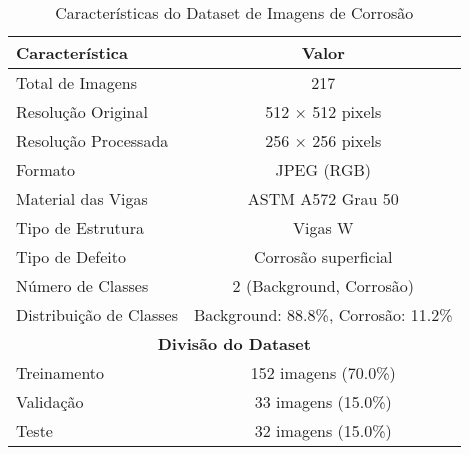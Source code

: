\begin{table}[htbp]
\centering
\caption{Características do Dataset de Imagens de Corrosão}
\label{tab:dataset_caracteristicas}
\begin{tabular}{|l|c|}
\hline
\textbf{Característica} & \textbf{Valor} \\
\hline
Total de Imagens & 217 \\
\hline
Resolução Original & 512 × 512 pixels \\
\hline
Resolução Processada & 256 × 256 pixels \\
\hline
Formato & JPEG (RGB) \\
\hline
Material das Vigas & ASTM A572 Grau 50 \\
\hline
Tipo de Estrutura & Vigas W \\
\hline
Tipo de Defeito & Corrosão superficial \\
\hline
Número de Classes & 2 (Background, Corrosão) \\
\hline
Distribuição de Classes & Background: 88.8\%, Corrosão: 11.2\% \\
\hline
\multicolumn{2}{|c|}{\textbf{Divisão do Dataset}} \\
\hline
Treinamento & 152 imagens (70.0\%) \\
\hline
Validação & 33 imagens (15.0\%) \\
\hline
Teste & 32 imagens (15.0\%) \\
\hline
\end{tabular}
\end{table}
